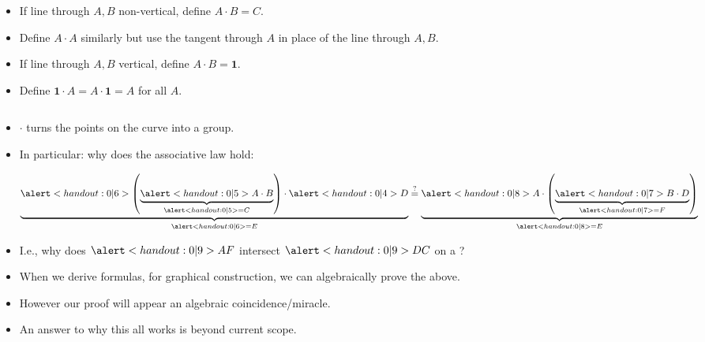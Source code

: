 \begin{frame}[fragile]
\begin{columns}
	\begin{definition}
		\begin{itemize}
			\item If line through $A,B$ non-vertical, define $A\cdot B = C$.
			\item Define $A\cdot A$ similarly but use the tangent through $A$ in place of the line through $A, B$.
			\item If line through $A,B$ vertical, define $A\cdot B = \mathbf 1$.
			\item Define $\mathbf 1\cdot A = A\cdot \mathbf 1 = A$ for all $ A$.
		\end{itemize}
	\end{definition}
\end{columns}
\begin{itemize}
\item<2-> $\cdot$ turns the points on the curve into a group.
\item<3-> In particular: why does the associative law hold:

\hfil \hfil $ \underbrace{ \alertNoH{6}{ \left( \underbrace{ \alertNoH{5}{A\cdot B}}_{\alertNoH{5}{=C} } \right) \cdot\alertNoH{4}{ D}} }_{\alertNoH{6}{ =E}} \stackrel{?}{=}  \underbrace{\alertNoH{8}{ A\cdot \left( \underbrace{ \alertNoH{7}{B\cdot D}}_{\alertNoH{7}{=F}}\right) } }_{\alertNoH{8}{=E}}$
\item<9-> I.e., why does  $\alertNoH{9}{AF}$ intersect $\alertNoH{9}{DC}$ on a ?
\item<10-> When we derive formulas, for graphical construction, we can algebraically prove the above.
\item<11-> However our proof will appear an algebraic coincidence/miracle.
\item<12-> An answer to why this all works is beyond current scope.
\end{itemize}



\vskip 10cm

\end{frame}

